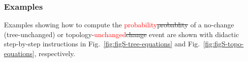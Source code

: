 \documentclass[11pt]{article}
\begin{document}
\subsubsection{Examples}
Examples showing how to compute the \textcolor{red}{probability}\sout{probablity} of a no-change (tree-unchanged) 
or topology-\textcolor{red}{unchanged}\sout{change} event are shown with didactic step-by-step instructions in 
Fig.~\ref{fig:figS-tree-equations} and Fig.~\ref{fig:figS-topo-equations}, 
respectively.





\end{document}
